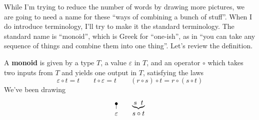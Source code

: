 \documentclass{book}
\begin{document}
While I'm trying to reduce the number of words by drawing more pictures, we are going to need a name for these ``ways of combining a bunch of stuff''. When I do introduce terminology, I'll try to make it the standard terminology. The standard name is ``monoid'', which is Greek for ``one-ish'', as in ``you can take any sequence of things and combine them into one thing''. Let's review the definition.

\newcommand{\neu}{\varepsilon}
\newcommand{\com}{\circ}
A \textbf{monoid} is given by a type $T$, a value $\neu$ in $T$, and an operator $\com$ which takes two inputs from $T$ and yields one output in $T$, satisfying the laws
\[
\neu\com t = t \qquad
t\com\neu = t \qquad
(r\com s)\com t = r\com(s\com t)
\]
We've been drawing
\[
\naw\neu \qquad \wye st{s\com t}
\]
\end{document}

